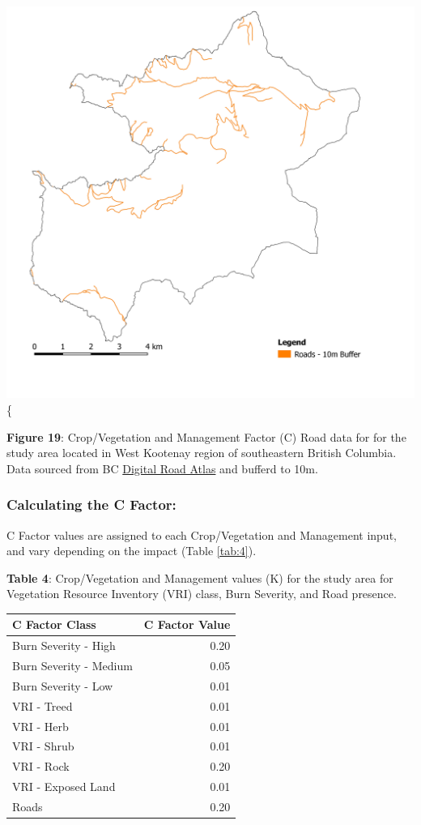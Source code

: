 \documentclass[
]{article}
\begin{document}
\includegraphics{img/c_factor_input_roads10m.png}\{

\textbf{Figure 19}: Crop/Vegetation and Management Factor (C) Road data for for the study area located in West Kootenay region of southeastern British Columbia. Data sourced from BC \href{https://www2.gov.bc.ca/gov/content/data/geographic-data-services/topographic-data/roads}{Digital Road Atlas} and bufferd to 10m.

\hypertarget{sec-calculating-the-c-factor}{%
\subsubsection*{Calculating the C Factor:}\label{sec-calculating-the-c-factor}}

C Factor values are assigned to each Crop/Vegetation and Management input, and vary depending on the impact (Table \ref{tab:4}).

\textbf{Table 4}: Crop/Vegetation and Management values (K) for the study area for Vegetation Resource Inventory (VRI) class, Burn Severity, and Road presence.

\begin{table}
\centering
\begin{tabular}[t]{l|r}
\hline
C Factor Class & C Factor Value\\
\hline
Burn Severity - High & 0.20\\
\hline
Burn Severity - Medium & 0.05\\
\hline
Burn Severity - Low & 0.01\\
\hline
VRI - Treed & 0.01\\
\hline
VRI - Herb & 0.01\\
\hline
VRI - Shrub & 0.01\\
\hline
VRI - Rock & 0.20\\
\hline
VRI - Exposed Land & 0.01\\
\hline
Roads & 0.20\\
\hline
\end{tabular}
\end{table}
\end{document}
